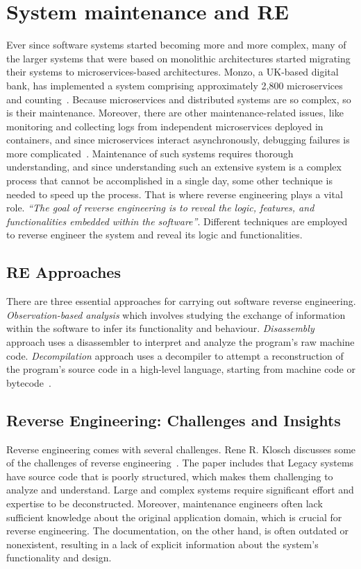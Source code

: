 \newpage
\section{System maintenance and RE}

Ever since software systems started becoming more and more complex, many of the larger systems that were based on monolithic architectures started migrating their systems to microservices-based architectures. Monzo, a UK-based digital bank, has implemented a system comprising approximately 2,800 microservices and counting~\citep{monzoMicroservices}. Because microservices and distributed systems are so complex, so is their maintenance. Moreover, there are other maintenance-related issues, like monitoring and collecting logs from independent microservices deployed in containers, and since microservices interact asynchronously, debugging failures is more complicated~\citep{Waseem_2021}. Maintenance of such systems requires thorough understanding, and since understanding such an extensive system is a complex process that cannot be accomplished in a single day, some other technique is needed to speed up the process. That is where reverse engineering plays a vital role. \textit{``The goal of reverse engineering is to reveal the logic, features, and functionalities embedded within the software''}\citep{digitalai_reverse_engineering}. Different techniques are employed to reverse engineer the system and reveal its logic and functionalities.

\subsection{RE Approaches}
There are three essential approaches for carrying out software reverse engineering. \textit{Observation-based analysis} which involves studying the exchange of information within the software to infer its functionality and behaviour. \textit{Disassembly} approach uses a disassembler to interpret and analyze the program's raw machine code. \textit{Decompilation} approach uses a decompiler to attempt a reconstruction of the program's source code in a high-level language, starting from machine code or bytecode~\citep{twoFacesOfSRE}.

\subsection{Reverse Engineering: Challenges and Insights}
Reverse engineering comes with several challenges. Rene R. Klosch discusses some of the challenges of reverse engineering~\citep{klosch1996reverse}. The paper includes that Legacy systems have source code that is poorly structured, which makes them challenging to analyze and understand. Large and complex systems require significant effort and expertise to be deconstructed. Moreover, maintenance engineers often lack sufficient knowledge about the original application domain, which is crucial for reverse engineering. The documentation, on the other hand, is often outdated or nonexistent, resulting in a lack of explicit information about the system's functionality and design.

